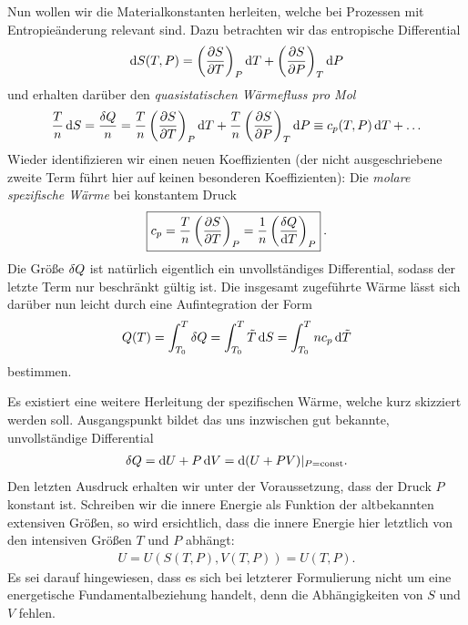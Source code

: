 Nun wollen wir die Materialkonstanten herleiten, welche bei Prozessen mit Entropieänderung relevant sind.
Dazu betrachten wir das entropische Differential
\begin{align*}
    \mathop{}\!\mathrm{d} S (T,P)= \left( \frac{\partial S}{\partial T}\right)_P \mathop{}\!\mathrm{d} T+\left( \frac{\partial S}{\partial P}\right)_T \mathop{}\!\mathrm{d} P
\end{align*}
und erhalten darüber den \emph{quasistatischen Wärmefluss pro Mol}
\begin{align*}
    \frac{T}{\sm}\diff S=\frac{\udiff Q}{\sm}=\frac{T}{\sm}\left( \frac{\partial S}{\partial T}\right)_P \diff T+\frac{T}{\sm}\left( \frac{\partial S}{\partial P}\right)_T \diff P\equiv c_p(T,P)\diff T+\ldots %
\end{align*}
Wieder identifizieren wir einen neuen Koeffizienten (der nicht ausgeschriebene zweite Term führt hier auf keinen besonderen Koeffizienten): Die \emph{molare spezifische Wärme} bei konstantem Druck
\begin{align*}
    \boxed{c_p=\frac{T}{n} \left( \frac{\partial S}{\partial T} \right)_P= \frac{1}{n} \left( \frac{\mathop{}\!\delta Q}{\mathop{}\!\mathrm{d} T} \right)_P }\:.
\end{align*}
Die Größe $\mathop{}\!\delta Q$ ist natürlich eigentlich ein unvollständiges Differential, sodass der letzte Term nur beschränkt gültig ist. 
Die insgesamt zugeführte Wärme lässt sich darüber nun leicht durch eine Aufintegration der Form
\begin{align*}
    Q(T)=\int_{T_0}^{T} \mathop{}\!\delta Q = \int_{T_0}^{T}\Tilde{T} \mathop{}\!\mathrm{d} S = \int_{T_0}^{T}n c_p\mathop{}\!\mathrm{d} \Tilde{T}
\end{align*}
bestimmen.

Es existiert eine weitere Herleitung der spezifischen Wärme, welche kurz skizziert werden soll. Ausgangspunkt bildet das uns inzwischen gut bekannte, unvollständige Differential
\begin{align*}
    \mathop{}\!\delta Q=\mathop{}\!\mathrm{d} U +P\mathop{}\!\mathrm{d} V= \mathop{}\!\mathrm{d}(U+PV)|_{P=\mathrm{const}}.
\end{align*}
Den letzten Ausdruck erhalten wir unter der Voraussetzung, dass der Druck $P$ konstant ist. Schreiben wir die innere Energie als Funktion der altbekannten extensiven Größen, so wird ersichtlich, dass die innere Energie hier letztlich von den intensiven Größen $T$ und $P$ abhängt:
\begin{align*}
    U=U(S(T,P),V(T,P))=U(T,P).
\end{align*}
Es sei darauf hingewiesen, dass es sich bei letzterer Formulierung nicht um eine energetische Fundamentalbeziehung handelt, denn die Abhängigkeiten von $S$ und $V$ fehlen.


